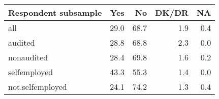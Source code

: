 \begin{table}[ht]
\centering
\begin{tabular}{lrrrr}
  \hline
Respondent subsample & Yes & No & DK/DR & NA \\ 
  \hline
all & 29.0 & 68.7 & 1.9 & 0.4 \\ 
  audited & 28.8 & 68.8 & 2.3 & 0.0 \\ 
  nonaudited & 28.4 & 69.8 & 1.6 & 0.2 \\ 
  selfemployed & 43.3 & 55.3 & 1.4 & 0.0 \\ 
  not.selfemployed & 24.1 & 74.2 & 1.3 & 0.4 \\ 
   \hline
\end{tabular}
\end{table}
